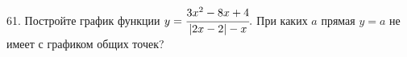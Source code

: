 61. Постройте график функции $y=\cfrac{3x^2-8x+4}{|2x-2|-x}.$ При каких $a$ прямая $y=a$ не имеет с графиком общих точек?\\

